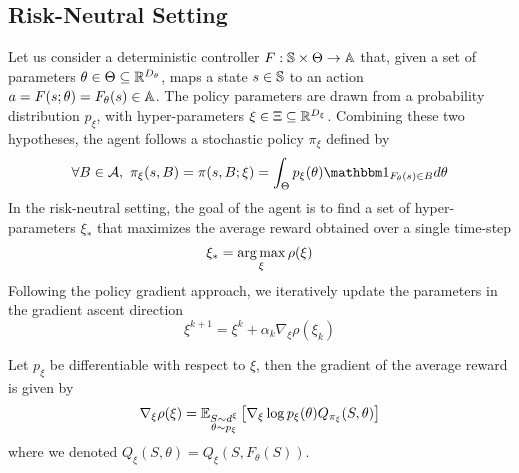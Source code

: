 \subsection{Risk-Neutral Setting}
Let us consider a deterministic controller $F: \S \times
\Theta \to \A$ that, given a set of parameters $\theta \in \Theta \subseteq
\R^{D_\theta}$, maps a state $s \in \S$ to an action $a = F(s; \theta) =
F_\theta(s) \in \A$. The policy parameters are drawn from a probability distribution $p_\xi$, with hyper-parameters $\xi \in \Xi \subseteq \R^{D_\xi}$. Combining these two
hypotheses, the agent follows a stochastic policy $\pi_\xi$ defined by
\begin{equation}
	\forall B \in \calA ,\ \pi_\xi(s,B) = \pi(s, B; \xi) = \int_\Theta p_\xi(\theta) 
	\ind{F_{\theta}(s)\in B} d\theta
\end{equation}
In the risk-neutral setting, the goal of the agent is to find a set of hyper-parameters $\xi_*$ that maximizes the average reward obtained over a single time-step 
\begin{equation*}
	\xi_* = \argmax_\xi \rho(\xi)
\end{equation*}
Following the policy gradient approach, we iteratively update the parameters in the gradient ascent direction 
\begin{equation*}
	\xi^{k+1} = \xi^k + \alpha_k \nabla_\xi \rho(\xi_k)
\end{equation*}
\begin{theorem}
	Let $p_\xi$ be differentiable with respect to $\xi$, then the gradient of the average reward is given by
	\begin{equation}
		\nabla_\xi \rho(\xi) = \E[\substack{S \sim d^\xi\\\theta \sim p_\xi}]{\nabla_\xi \log p_\xi(\theta) Q_{\pi_\xi}(S, \theta)}
	\end{equation}
	where we denoted $Q_\xi(S, \theta) = Q_\xi(S, F_\theta(S))$.
\end{theorem}
